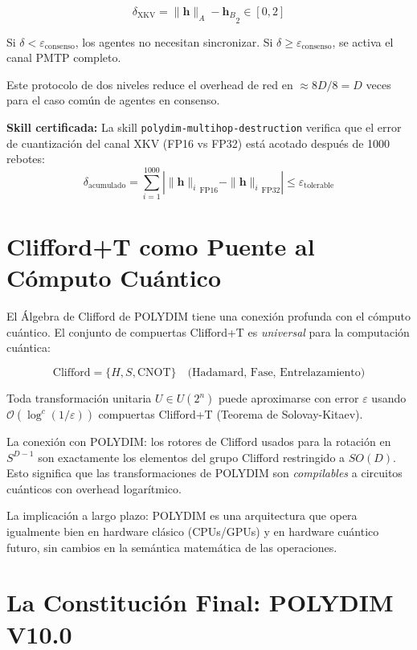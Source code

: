 \begin{equation}
\delta_{\text{XKV}} = \|{\mathbf{h}\|_A - \mathbf{h}_B}_2 \in [0, 2]
\end{equation}

Si $\delta < \varepsilon_{\text{consenso}}$, los agentes no necesitan sincronizar.
Si $\delta \ge \varepsilon_{\text{consenso}}$, se activa el canal PMTP completo.

Este protocolo de dos niveles reduce el overhead de red en $\approx 8D/8 = D$ veces
para el caso común de agentes en consenso.

\textbf{Skill certificada:} La skill \texttt{polydim-multihop-destruction} verifica
que el error de cuantización del canal XKV (FP16 vs FP32) está acotado después de
1000 rebotes:
\begin{equation}
\delta_{\text{acumulado}} = \sum_{i=1}^{1000} |\|{\mathbf{h}\|_i}_{\text{FP16}} - \|{\mathbf{h}\|_i}_{\text{FP32}}| \le \varepsilon_{\text{tolerable}}
\end{equation}

\section{Clifford+T como Puente al Cómputo Cuántico}

El Álgebra de Clifford de POLYDIM tiene una conexión profunda con el cómputo cuántico.
El conjunto de compuertas Clifford+T es \textit{universal} para la computación cuántica:

\begin{equation}
\text{Clifford} = \{H, S, \text{CNOT}\} \quad \text{(Hadamard, Fase, Entrelazamiento)}
\end{equation}

Toda transformación unitaria $U \in U(2^n)$ puede aproximarse con error $\varepsilon$
usando $\mathcal{O}(\log^c(1/\varepsilon))$ compuertas Clifford+T (Teorema de Solovay-Kitaev).

La conexión con POLYDIM: los rotores de Clifford usados para la rotación en $S^{D-1}$
son exactamente los elementos del grupo Clifford restringido a $SO(D)$. Esto significa
que las transformaciones de POLYDIM son \textit{compilables} a circuitos cuánticos
con overhead logarítmico.

La implicación a largo plazo: POLYDIM es una arquitectura que opera igualmente bien
en hardware clásico (CPUs/GPUs) y en hardware cuántico futuro, sin cambios en la
semántica matemática de las operaciones.

\section{La Constitución Final: POLYDIM V10.0}

